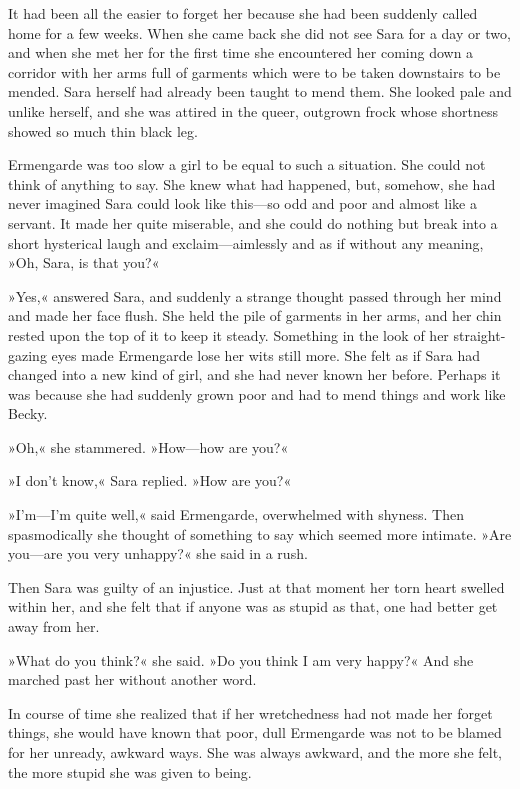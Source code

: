 It had been all the easier to forget her because she had been suddenly called home for a few weeks. When she came back she did not see Sara for a day or two, and when she met her for the first time she encountered her coming down a corridor with her arms full of garments which were to be taken downstairs to be mended. Sara herself had already been taught to mend them. She looked pale and unlike herself, and she was attired in the queer, outgrown frock whose shortness showed so much thin black leg.

Ermengarde was too slow a girl to be equal to such a situation. She could not think of anything to say. She knew what had happened, but, somehow, she had never imagined Sara could look like this—so odd and poor and almost like a servant. It made her quite miserable, and she could do nothing but break into a short hysterical laugh and exclaim—aimlessly and as if without any meaning, »Oh, Sara, is that you?«

»Yes,« answered Sara, and suddenly a strange thought passed through her mind and made her face flush. She held the pile of garments in her arms, and her chin rested upon the top of it to keep it steady. Something in the look of her straight-gazing eyes made Ermengarde lose her wits still more. She felt as if Sara had changed into a new kind of girl, and she had never known her before. Perhaps it was because she had suddenly grown poor and had to mend things and work like Becky.

»Oh,« she stammered. »How—how are you?«

»I don't know,« Sara replied. »How are you?«

»I'm—I'm quite well,« said Ermengarde, overwhelmed with shyness. Then spasmodically she thought of something to say which seemed more intimate. »Are you—are you very unhappy?« she said in a rush.

Then Sara was guilty of an injustice. Just at that moment her torn heart swelled within her, and she felt that if anyone was as stupid as that, one had better get away from her.

»What do you think?« she said. »Do you think I am very happy?« And she marched past her without another word.

In course of time she realized that if her wretchedness had not made her forget things, she would have known that poor, dull Ermengarde was not to be blamed for her unready, awkward ways. She was always awkward, and the more she felt, the more stupid she was given to being.

